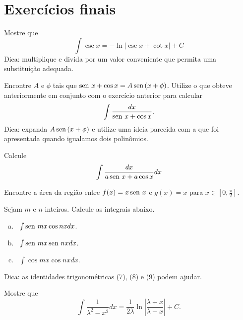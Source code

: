 \section{Exercícios finais}

	\begin{exer}
		Mostre que $$\int \csc x = -\ln\left|\csc x + \cot x\right| + C$$ 	
		Dica: multiplique e divida por um valor conveniente que permita uma substituição adequada.
	\end{exer}

	\begin{exer}
		Encontre $A$ e $\phi$ tais que $\operatorname{sen}\, x + \cos x = A\operatorname{sen}\,(x+\phi)$. Utilize o que obteve anteriormente em conjunto com o exercício anterior para calcular $$\int \frac{dx}{\operatorname{sen}\, x + \cos x}.$$ 
		Dica: expanda $A\operatorname{sen}\,(x+\phi)$ e utilize uma ideia parecida com a que foi apresentada quando igualamos dois polinômios.
	\end{exer}
	
	\begin{exer}
		Calcule $$\int \frac{dx}{a\operatorname{sen}\, x + a\cos x}dx$$
	\end{exer}
	
	\begin{exer}
		Encontre a área da região entre $f(x) = x \operatorname{sen}\, x$ e $g(x) = x$ para $x \in [0, \frac{\pi}{2}]$. 
	\end{exer}
	
	\begin{exer}
		Sejam $m$ e $n$ inteiros. Calcule as integrais abaixo.
		\begin{enumerate}[a)]
			\item~$\int\operatorname{sen}\,{mx} \cos{nx}dx$.
			\item~$\int \operatorname{sen}\,{mx} \operatorname{sen}\,{nx}dx$.
			\item~$\int \cos{mx} \cos{nx}dx$.
		\end{enumerate}
		Dica: as identidades trigonométricas (7), (8) e (9) podem ajudar.
	\end{exer}
	
	\begin{exer}
		Mostre que $$\int \frac{1}{\lambda^2-x^2}dx = \frac{1}{2\lambda} \ln{\left|\frac{\lambda + x}{\lambda-x}\right|} + C.$$
	\end{exer}	



